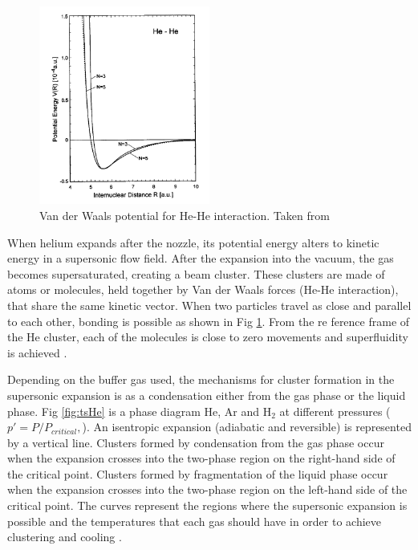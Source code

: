 \begin{figure}[h!]
\centering
	\includegraphics[width=0.5\textwidth]{../Images/waanderwaal_hehe.PNG}
	\caption[Waan der Wall He-He potential]{ Van der Waals potential for He-He interaction. Taken from \cite{blanco_quantum_2010}}
	\label{img:WanderHe}
\end{figure}

When helium expands after the nozzle, its potential energy alters to kinetic energy in a supersonic flow field. After the expansion into the vacuum, the gas becomes supersaturated, creating a beam cluster. These clusters are made of atoms or molecules, held together by Van der Waals forces (He-He interaction), that share the same kinetic vector. When two particles travel as close and parallel to each other, bonding is possible as shown in Fig \ref{img:WanderHe}. From the re
ference frame of the He cluster, each of the molecules is close to zero movements and superfluidity is achieved \cite{hagena_cluster_1972}.
 
Depending on the buffer gas used, the mechanisms for cluster formation in the supersonic expansion is as a condensation either from the gas phase or the liquid phase. Fig 	\ref{fig:tsHe} is a phase diagram He, Ar and H$_{2}$ at different pressures ($p'=P/P_{critical},$). An isentropic expansion (adiabatic and reversible) is represented by a vertical line. Clusters formed by condensation from the gas phase occur when the expansion crosses into the two-phase region on the right-hand side of the critical point. Clusters formed by fragmentation of the liquid phase occur when the expansion crosses into the two-phase region on the left-hand side of the critical point\cite{knuth_average_1999}. The curves represent the regions where the supersonic expansion is possible and the temperatures that each gas should have in order to achieve clustering and cooling \cite{knuth_average_1999}.

